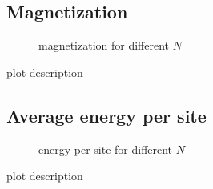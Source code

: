 \documentclass{scrartcl}
\begin{document}
\subsection{Magnetization}
\begin{figure}[htbp]
	
	\caption{magnetization for different $N$}
	\label{fig:magnetization}
\end{figure}
plot description
\subsection{Average energy per site}
\begin{figure}[htbp]
	
	\caption{energy per site for different $N$}
	\label{fig:energy}
\end{figure}
plot description

\newpage	
\listoffigures
\printbibliography
\end{document}
